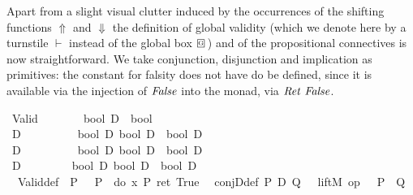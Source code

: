 Apart from a slight visual clutter induced by the occurrences of the shifting
functions $\Uparrow$ and $\Downarrow$ the definition of global validity (which we denote here by
a turnstile $\vdash$ instead of the global box $\gbox$) and of the propositional
connectives is now straightforward. We take conjunction, disjunction and
implication as primitives: the constant for falsity does not have do be defined,
since it is available via the injection of $\mathit{False}$ into the monad, \IE via
$\mathit{Ret}~\mathit{False}$.
\begin{isabellebody}
\isanewline
{}\isanewline
\ {\isachardoublequote}Valid{\isachardoublequote}\ \ \ \ \ \ \ {\isacharcolon}{\isacharcolon}\ {\isachardoublequote}bool\ D\ {\isasymRightarrow}\ bool{\isachardoublequote}\ \ \ \ \ \ \ \ \ \ \ \ \ \ \ {\isacharparenleft}{\isachardoublequote}{\isacharparenleft}{\isasymturnstile}\ {\isacharunderscore}{\isacharparenright}{\isachardoublequote}\ {}{}{\isacharparenright}\isanewline
\ {\isachardoublequote}{\isasymand}\isactrlsub D{\isachardoublequote}\ \ \ \ \ \ \ \ \ {\isacharcolon}{\isacharcolon}\ {\isachardoublequote}{\isacharbrackleft}bool\ D{\isacharcomma}\ bool\ D{\isacharbrackright}\ {\isasymRightarrow}\ bool\ D{\isachardoublequote}\ \ \ \ \ {\isacharparenleft}\ {}{}{\isacharparenright}\isanewline
\ {\isachardoublequote}{\isasymor}\isactrlsub D{\isachardoublequote}\ \ \ \ \ \ \ \ \ {\isacharcolon}{\isacharcolon}\ {\isachardoublequote}{\isacharbrackleft}bool\ D{\isacharcomma}\ bool\ D{\isacharbrackright}\ {\isasymRightarrow}\ bool\ D{\isachardoublequote}\ \ \ \ \ {\isacharparenleft}\ {}{}{\isacharparenright}\isanewline
\ {\isachardoublequote}{\isasymlongrightarrow}\isactrlsub D{\isachardoublequote}\ \ \ \ \ \ \ \ {\isacharcolon}{\isacharcolon}\ {\isachardoublequote}{\isacharbrackleft}bool\ D{\isacharcomma}\ bool\ D{\isacharbrackright}\ {\isasymRightarrow}\ bool\ D{\isachardoublequote}\ \ \ \ {\isacharparenleft}\ {}{}{\isacharparenright}\isamarkupfalse%
\isanewline
{}\isanewline
\ \ Valid{\isacharunderscore}def{\isacharcolon}\ {\isachardoublequote}{\isasymturnstile}\ P\ {\isasymequiv}\ {\isasymDown}\ P\ {\isacharequal}\ do\ {\isacharbraceleft}x{\isasymleftarrow}{\isacharparenleft}{\isasymDown}\ P{\isacharparenright}{\isacharsemicolon}\ ret\ True{\isacharbraceright}{\isachardoublequote}\isanewline
\ \ conjD{\isacharunderscore}def{\isacharcolon}\ {\isachardoublequote}P\ {\isasymand}\isactrlsub D\ Q\ {\isasymequiv}\ {\isasymUp}\ {\isacharparenleft}liftM{}\ {\isacharparenleft}op\ {\isasymand}{\isacharparenright}\ {\isacharparenleft}{\isasymDown}\ P{\isacharparenright}\ {\isacharparenleft}{\isasymDown}\ Q{\isacharparenright}{\isacharparenright}{\isachardoublequote}\isanewline

\end{isabellebody}

